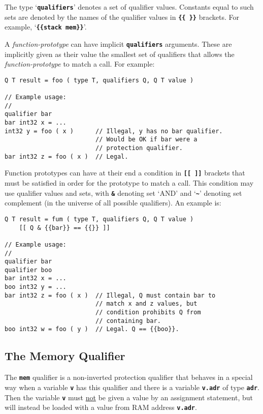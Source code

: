\documentclass[12pt]{article}
\makeatletter
\newcommand{\TT}[1]{{\tt \bfseries #1}}
\newcommand{\ttkey}[1]{\TT{#1}\index{#1@{\tt #1}}}
\newenvironment{indpar}[1][0.3in]%
	{\begin{list}{}%
		     {\setlength{\itemsep}{0in}%
		      \setlength{\topsep}{0in}%
		      \setlength{\parsep}{1ex}%
		      \setlength{\labelwidth}{#1}%
		      \setlength{\leftmargin}{#1}%
		      \addtolength{\leftmargin}{\labelsep}}%
	 \item}%
	{\end{list}}
\makeatother
\begin{document}
The type `\ttkey{qualifiers}' denotes a set of qualifier values.
Constants equal to such sets are denoted by the names of the
qualifier values in \TT{\{\{~\}\}} brackets.  For example,
`\TT{\{\{stack mem\}\}}'.

A {\em function-prototype} can have implicit \TT{qualifiers} arguments.
These are implicitly given as their value the smallest set of qualifiers
that allows the {\em function-prototype} to match a call.  For example:

\begin{indpar}\begin{verbatim}
Q T result = foo ( type T, qualifiers Q, Q T value )

// Example usage:
//
qualifier bar
bar int32 x = ...
int32 y = foo ( x )      // Illegal, y has no bar qualifier.
                         // Would be OK if bar were a
                         // protection qualifier.
bar int32 z = foo ( x )  // Legal.
\end{verbatim}\end{indpar}

Function prototypes can have at their end a condition in \TT{[[~]]}
brackets that must be satisfied in order for the prototype to match
a call.  This condition may use qualifier values and sets, with
\TT{\&} denoting set `AND' and `\TT{\textasciitilde}' denoting
set complement (in the universe of all possible qualifiers).
An example is:

\begin{indpar}\begin{verbatim}
Q T result = fum ( type T, qualifiers Q, Q T value )
    [[ Q & {{bar}} == {{}} ]]

// Example usage:
//
qualifier bar
qualifier boo
bar int32 x = ...
boo int32 y = ...
bar int32 z = foo ( x )  // Illegal, Q must contain bar to
                         // match x and z values, but
                         // condition prohibits Q from
                         // containing bar.
boo int32 w = foo ( y )  // Legal. Q == {{boo}}.
\end{verbatim}\end{indpar}

\subsection{The Memory Qualifier}
\label{THE-MEM-QUALIFIER}

The \ttkey{mem} qualifier is a non-inverted protection qualifier that behaves
in a special way when a variable \TT{v} has this qualifier and
there is a variable \TT{v.adr} of type \TT{adr}.  Then the
variable \TT{v} must \underline{not} be given a value by an
assignment statement, but will instead be loaded with a value
from RAM address \TT{v.adr}.
\end{document}
